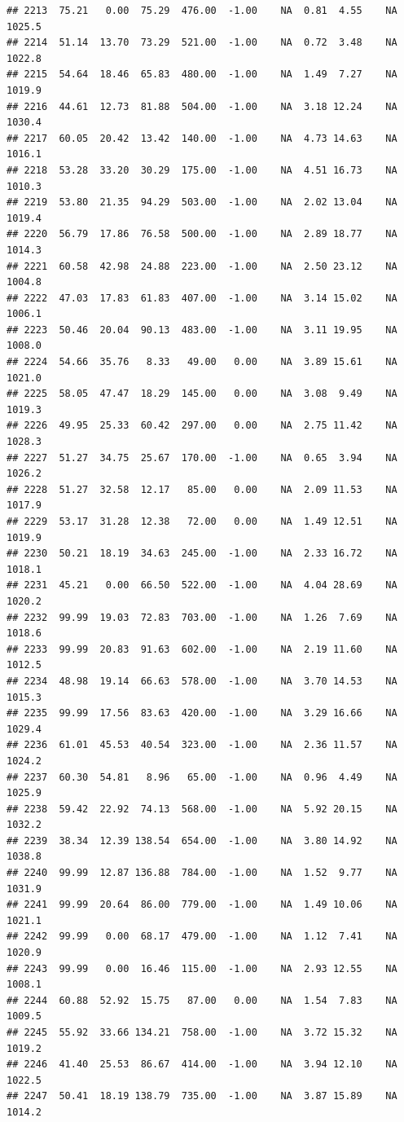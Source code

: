 \documentclass{article}\usepackage{graphicx, color}
\makeatletter
\newenvironment{kframe}{%
 \def\at@end@of@kframe{}%
 \ifinner\ifhmode%
  \def\at@end@of@kframe{\end{minipage}}%
  \begin{minipage}{\columnwidth}%
 \fi\fi%
 \def\FrameCommand##1{\hskip\@totalleftmargin \hskip-\fboxsep
 \colorbox{shadecolor}{##1}\hskip-\fboxsep
     \hskip-\linewidth \hskip-\@totalleftmargin \hskip\columnwidth}%
 \MakeFramed {\advance\hsize-\width
   \@totalleftmargin\z@ \linewidth\hsize
   \@setminipage}}%
 {\par\unskip\endMakeFramed%
 \at@end@of@kframe}
\newenvironment{knitrout}{}{} %
\makeatother
\begin{document}
\begin{knitrout}
\begin{kframe}
\begin{verbatim}
## 2213  75.21   0.00  75.29  476.00  -1.00    NA  0.81  4.55    NA 1025.5
## 2214  51.14  13.70  73.29  521.00  -1.00    NA  0.72  3.48    NA 1022.8
## 2215  54.64  18.46  65.83  480.00  -1.00    NA  1.49  7.27    NA 1019.9
## 2216  44.61  12.73  81.88  504.00  -1.00    NA  3.18 12.24    NA 1030.4
## 2217  60.05  20.42  13.42  140.00  -1.00    NA  4.73 14.63    NA 1016.1
## 2218  53.28  33.20  30.29  175.00  -1.00    NA  4.51 16.73    NA 1010.3
## 2219  53.80  21.35  94.29  503.00  -1.00    NA  2.02 13.04    NA 1019.4
## 2220  56.79  17.86  76.58  500.00  -1.00    NA  2.89 18.77    NA 1014.3
## 2221  60.58  42.98  24.88  223.00  -1.00    NA  2.50 23.12    NA 1004.8
## 2222  47.03  17.83  61.83  407.00  -1.00    NA  3.14 15.02    NA 1006.1
## 2223  50.46  20.04  90.13  483.00  -1.00    NA  3.11 19.95    NA 1008.0
## 2224  54.66  35.76   8.33   49.00   0.00    NA  3.89 15.61    NA 1021.0
## 2225  58.05  47.47  18.29  145.00   0.00    NA  3.08  9.49    NA 1019.3
## 2226  49.95  25.33  60.42  297.00   0.00    NA  2.75 11.42    NA 1028.3
## 2227  51.27  34.75  25.67  170.00  -1.00    NA  0.65  3.94    NA 1026.2
## 2228  51.27  32.58  12.17   85.00   0.00    NA  2.09 11.53    NA 1017.9
## 2229  53.17  31.28  12.38   72.00   0.00    NA  1.49 12.51    NA 1019.9
## 2230  50.21  18.19  34.63  245.00  -1.00    NA  2.33 16.72    NA 1018.1
## 2231  45.21   0.00  66.50  522.00  -1.00    NA  4.04 28.69    NA 1020.2
## 2232  99.99  19.03  72.83  703.00  -1.00    NA  1.26  7.69    NA 1018.6
## 2233  99.99  20.83  91.63  602.00  -1.00    NA  2.19 11.60    NA 1012.5
## 2234  48.98  19.14  66.63  578.00  -1.00    NA  3.70 14.53    NA 1015.3
## 2235  99.99  17.56  83.63  420.00  -1.00    NA  3.29 16.66    NA 1029.4
## 2236  61.01  45.53  40.54  323.00  -1.00    NA  2.36 11.57    NA 1024.2
## 2237  60.30  54.81   8.96   65.00  -1.00    NA  0.96  4.49    NA 1025.9
## 2238  59.42  22.92  74.13  568.00  -1.00    NA  5.92 20.15    NA 1032.2
## 2239  38.34  12.39 138.54  654.00  -1.00    NA  3.80 14.92    NA 1038.8
## 2240  99.99  12.87 136.88  784.00  -1.00    NA  1.52  9.77    NA 1031.9
## 2241  99.99  20.64  86.00  779.00  -1.00    NA  1.49 10.06    NA 1021.1
## 2242  99.99   0.00  68.17  479.00  -1.00    NA  1.12  7.41    NA 1020.9
## 2243  99.99   0.00  16.46  115.00  -1.00    NA  2.93 12.55    NA 1008.1
## 2244  60.88  52.92  15.75   87.00   0.00    NA  1.54  7.83    NA 1009.5
## 2245  55.92  33.66 134.21  758.00  -1.00    NA  3.72 15.32    NA 1019.2
## 2246  41.40  25.53  86.67  414.00  -1.00    NA  3.94 12.10    NA 1022.5
## 2247  50.41  18.19 138.79  735.00  -1.00    NA  3.87 15.89    NA 1014.2

\end{verbatim}
\end{kframe}
\end{knitrout}
\end{document}
